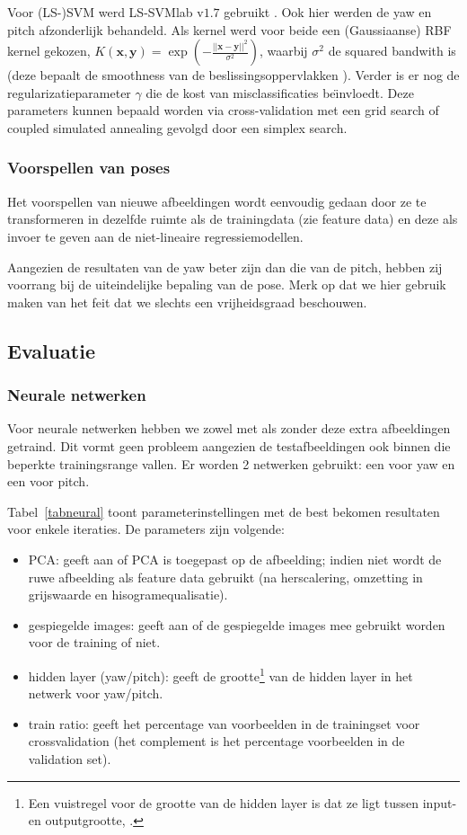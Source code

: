 \documentclass[a4paper,dutch,11pt]{scrartcl}
\begin{document}
Voor (LS-)SVM werd LS-SVMlab v$1.7$ gebruikt \cite{suykens2002least}. Ook hier werden de yaw en pitch afzonderlijk behandeld. Als kernel werd voor beide een (Gaussiaanse) RBF kernel gekozen, $K(\boldsymbol{x},\boldsymbol{y})=\exp{(-{\frac{||\boldsymbol{x}-\boldsymbol{y}||^2}{\sigma^2 }})}$, waarbij $\sigma^2$ de squared bandwith is (deze bepaalt de smoothness van de beslissingsoppervlakken \cite{blockeel}). Verder is er nog de regularizatieparameter $\gamma$ die de kost van misclassificaties be\"{\i}nvloedt. Deze parameters kunnen bepaald worden via cross-validation met een grid search of coupled simulated annealing gevolgd door een simplex search.


\subsubsection{Voorspellen van poses}
Het voorspellen van nieuwe afbeeldingen wordt eenvoudig gedaan door ze te transformeren in dezelfde ruimte als de trainingdata (zie feature data) en deze als invoer te geven aan de niet-lineaire regressiemodellen. 

Aangezien de resultaten van de yaw beter zijn dan die van de pitch,  hebben zij voorrang bij de uiteindelijke bepaling van de pose. Merk op dat we hier gebruik maken van het feit dat we slechts een vrijheidsgraad beschouwen.

\subsection{Evaluatie}
\subsubsection{Neurale netwerken}
Voor neurale netwerken hebben we zowel met als zonder deze extra afbeeldingen getraind. Dit vormt geen probleem aangezien de testafbeeldingen ook binnen die beperkte trainingsrange vallen. Er worden 2 netwerken gebruikt: een voor yaw en een voor pitch.

Tabel~\ref{tabneural} toont parameterinstellingen met de best bekomen resultaten voor enkele iteraties. De parameters zijn volgende:
\begin{itemize}
\item PCA: geeft aan of PCA is toegepast op de afbeelding; indien niet wordt de ruwe afbeelding als feature data gebruikt (na herscalering, omzetting in grijswaarde en hisogramequalisatie).
\item gespiegelde images: geeft aan of de gespiegelde images mee gebruikt worden voor de training of niet.
\item hidden layer (yaw/pitch): geeft de grootte\footnote{Een vuistregel voor de grootte van de hidden layer is dat ze ligt tussen input- en outputgrootte, \cite{hiddenlayer}.}  van de hidden layer in het netwerk voor yaw/pitch.
\item train ratio: geeft het percentage van voorbeelden in de trainingset voor crossvalidation (het complement is het percentage voorbeelden in de validation set).
\end{itemize}
\end{document}
